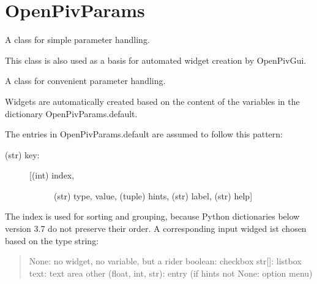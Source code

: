 \documentclass[letterpaper,10pt,english]{sphinxmanual}
\begin{document}
\section{OpenPivParams}
\label{\detokenize{openpivparams:module-openpivgui.OpenPivParams}}\label{\detokenize{openpivparams:openpivparams}}\label{\detokenize{openpivparams::doc}}
A class for simple parameter handling.

This class is also used as a basis for automated widget creation
by OpenPivGui.

\begin{fulllineitems}
\label{\detokenize{openpivparams:openpivgui.OpenPivParams.OpenPivParams}}
A class for convenient parameter handling.

Widgets are automatically created based on the content of the
variables in the dictionary OpenPivParams.default.

The entries in OpenPivParams.default are assumed to follow this
pattern:
\begin{description}
\item[{(str) key:}] \leavevmode\begin{description}
\item[{{[}(int) index,}] \leavevmode
(str) type,
value,
(tuple) hints,
(str) label,
(str) help{]}

\end{description}

\end{description}

The index is used for sorting and grouping, because Python
dictionaries below version 3.7 do not preserve their order. A
corresponding input widged ist chosen based on the type string:
\begin{quote}

None:                    no widget, no variable, but a rider
boolean:                 checkbox
str{[}{]}:                   listbox
text:                    text area
other (float, int, str): entry (if hints not None: option menu)
\end{quote}


\end{fulllineitems}
\end{document}
